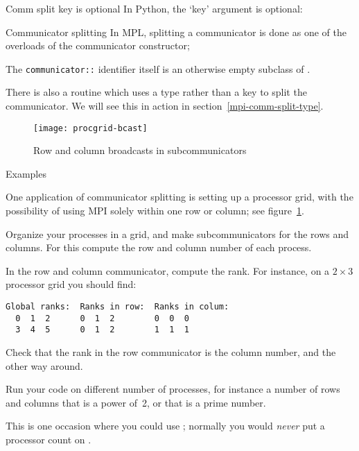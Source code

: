 \begin{pythonnote}{Comm split key is optional}
  In Python, the `key' argument is optional:
\end{pythonnote}

\begin{mplnote}{Communicator splitting}
  \label{mpl::split}
  In \ac{MPL}, splitting a communicator is done as one of the overloads
  of the communicator constructor;

  \begin{mplimpl}
    The \lstinline+communicator::+ identifier itself is an otherwise empty
    subclass of .
  \end{mplimpl}
\end{mplnote}


There is also a routine 
which uses a type rather than a key to split the communicator.
We will see this in action in section~\ref{mpi-comm-split-type}.

\begin{figure}[ht]
  \texttt{[image: procgrid-bcast]}
  \caption{Row and column broadcasts in subcommunicators}
  \label{fig:procgrid-bcast}
\end{figure}

 {Examples}

One application of communicator splitting is setting up a processor
grid, with the possibility of using MPI solely within one row or
column; see figure~\ref{fig:procgrid-bcast}.

\begin{exercise}
  \label{ex:rowcolcomm}
  Organize your processes in a grid, and make subcommunicators for
  the rows and columns. For this compute the row and column number of
  each process.

  In the row and column communicator, compute the rank. For instance,
  on a $2\times3$ processor grid you should find:
\begin{verbatim}
Global ranks:  Ranks in row:  Ranks in colum:
  0  1  2      0  1  2        0  0  0
  3  4  5      0  1  2        1  1  1
\end{verbatim}

  Check that the rank in the row communicator is the column number,
  and the other way around.

  Run your code on different number of processes, for instance a
  number of rows and columns that is a power of~2, or that is a prime number.
\begin{tacc}
    This is one occasion where you could use ;
    normally you would \emph{never} put a processor count on .
\end{tacc}
\end{exercise}

